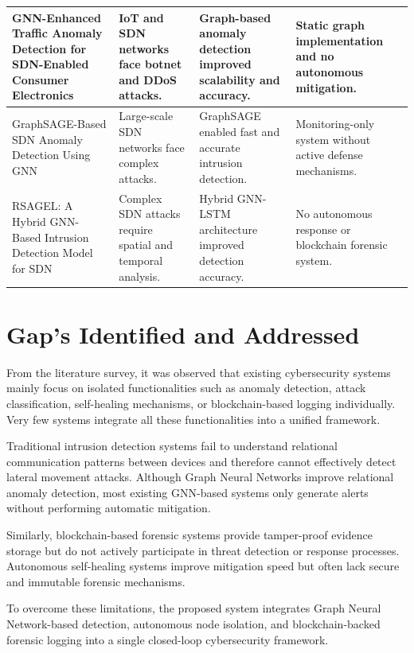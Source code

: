 \documentclass[12pt,a4paper]{report}
\begin{document}
\begin{table}[htbp]
\begin{tabular}{|m{3.4cm}|m{3.4cm}|m{3.4cm}|m{3.4cm}|}
GNN-Enhanced Traffic Anomaly Detection for SDN-Enabled Consumer Electronics
&
IoT and SDN networks face botnet and DDoS attacks.
&
Graph-based anomaly detection improved scalability and accuracy.
&
Static graph implementation and no autonomous mitigation.
\\
\hline

GraphSAGE-Based SDN Anomaly Detection Using GNN
&
Large-scale SDN networks face complex attacks.
&
GraphSAGE enabled fast and accurate intrusion detection.
&
Monitoring-only system without active defense mechanisms.
\\
\hline

RSAGEL: A Hybrid GNN-Based Intrusion Detection Model for SDN
&
Complex SDN attacks require spatial and temporal analysis.
&
Hybrid GNN-LSTM architecture improved detection accuracy.
&
No autonomous response or blockchain forensic system.
\\
\hline

\end{tabular}

\end{table}

\section{Gap's Identified and Addressed}
From the literature survey, it was observed that existing cybersecurity systems mainly focus on isolated functionalities such as anomaly detection, attack classification, self-healing mechanisms, or blockchain-based logging individually. Very few systems integrate all these functionalities into a unified framework.

Traditional intrusion detection systems fail to understand relational communication patterns between devices and therefore cannot effectively detect lateral movement attacks. Although Graph Neural Networks improve relational anomaly detection, most existing GNN-based systems only generate alerts without performing automatic mitigation.

Similarly, blockchain-based forensic systems provide tamper-proof evidence storage but do not actively participate in threat detection or response processes. Autonomous self-healing systems improve mitigation speed but often lack secure and immutable forensic mechanisms.

To overcome these limitations, the proposed system integrates Graph Neural Network-based detection, autonomous node isolation, and blockchain-backed forensic logging into a single closed-loop cybersecurity framework.
\end{document}
